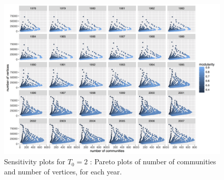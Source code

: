 \begin{figure}
\centering
\includegraphics[width=\textheight,height=\textwidth,angle=90]{figures/vcount_comnum_pareto_window3.png}
\caption{Sensitivity plots for $T_0 = 2$ : Pareto plots of number of communities and number of vertices, for each year.}
\label{fig:sensitivity-window3-2}
\end{figure}


